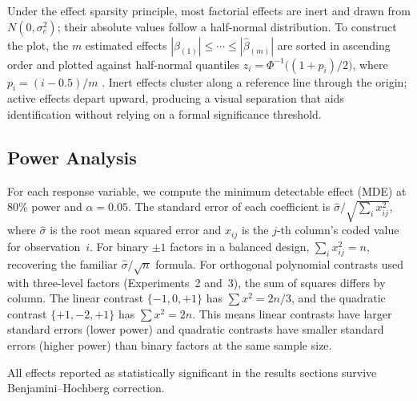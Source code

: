 Under the effect sparsity principle, most factorial effects are inert and drawn from $N(0, \sigma_e^2)$; their absolute values follow a half-normal distribution. To construct the plot, the $m$ estimated effects $|\hat{\beta}_{(1)}| \leq \cdots \leq |\hat{\beta}_{(m)}|$ are sorted in ascending order and plotted against half-normal quantiles $z_i = \Phi^{-1}\!\bigl((1 + p_i)/2\bigr)$, where $p_i = (i - 0.5)/m$ \citep{Daniel1959}. Inert effects cluster along a reference line through the origin; active effects depart upward, producing a visual separation that aids identification without relying on a formal significance threshold.

\subsection{Power Analysis}

For each response variable, we compute the minimum detectable effect (MDE) at 80\% power and $\alpha = 0.05$. The standard error of each coefficient is $\hat{\sigma} / \sqrt{\sum_i x_{ij}^2}$, where $\hat{\sigma}$ is the root mean squared error and $x_{ij}$ is the $j$-th column's coded value for observation~$i$. For binary $\pm 1$ factors in a balanced design, $\sum_i x_{ij}^2 = n$, recovering the familiar $\hat{\sigma}/\sqrt{n}$ formula. For orthogonal polynomial contrasts used with three-level factors (Experiments~2 and~3), the sum of squares differs by column. The linear contrast $\{-1, 0, +1\}$ has $\sum x^2 = 2n/3$, and the quadratic contrast $\{+1, -2, +1\}$ has $\sum x^2 = 2n$. This means linear contrasts have larger standard errors (lower power) and quadratic contrasts have smaller standard errors (higher power) than binary factors at the same sample size.

All effects reported as statistically significant in the results sections survive Benjamini--Hochberg correction.
